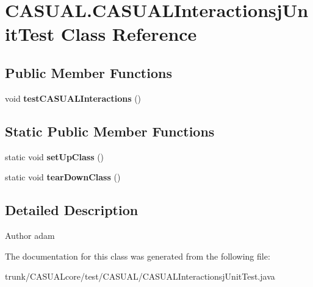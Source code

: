 \hypertarget{classCASUAL_1_1CASUALInteractionsjUnitTest}{\section{C\-A\-S\-U\-A\-L.\-C\-A\-S\-U\-A\-L\-Interactionsj\-Unit\-Test Class Reference}
\label{classCASUAL_1_1CASUALInteractionsjUnitTest}
}
\subsection*{Public Member Functions}
\begin{DoxyCompactItemize}
\item 
\hypertarget{classCASUAL_1_1CASUALInteractionsjUnitTest_a64a391116813aa0f8bd3d5e11335887a}{void {\bfseries test\-C\-A\-S\-U\-A\-L\-Interactions} ()}\label{classCASUAL_1_1CASUALInteractionsjUnitTest_a64a391116813aa0f8bd3d5e11335887a}

\end{DoxyCompactItemize}
\subsection*{Static Public Member Functions}
\begin{DoxyCompactItemize}
\item 
\hypertarget{classCASUAL_1_1CASUALInteractionsjUnitTest_a923fdc5c9d81cefa1a91638926c4e5c6}{static void {\bfseries set\-Up\-Class} ()}\label{classCASUAL_1_1CASUALInteractionsjUnitTest_a923fdc5c9d81cefa1a91638926c4e5c6}

\item 
\hypertarget{classCASUAL_1_1CASUALInteractionsjUnitTest_a4b1cb544659fec5aebb74dae55c72452}{static void {\bfseries tear\-Down\-Class} ()}\label{classCASUAL_1_1CASUALInteractionsjUnitTest_a4b1cb544659fec5aebb74dae55c72452}

\end{DoxyCompactItemize}


\subsection{Detailed Description}
\begin{DoxyAuthor}{Author}
adam 
\end{DoxyAuthor}


The documentation for this class was generated from the following file\-:\begin{DoxyCompactItemize}
\item 
trunk/\-C\-A\-S\-U\-A\-Lcore/test/\-C\-A\-S\-U\-A\-L/C\-A\-S\-U\-A\-L\-Interactionsj\-Unit\-Test.\-java\end{DoxyCompactItemize}
